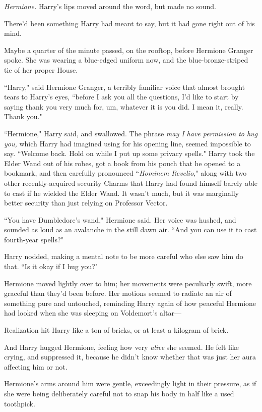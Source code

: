 \emph{Hermione.} Harry's lips moved around the word, but made no sound.

There'd been something Harry had meant to say, but it had gone right out of his mind.

Maybe a quarter of the minute passed, on the rooftop, before Hermione Granger spoke. She was wearing a blue-edged uniform now, and the blue-bronze-striped tie of her proper House.

``Harry," said Hermione Granger, a terribly familiar voice that almost brought tears to Harry's eyes, ``before I ask you all the questions, I'd like to start by saying thank you very much for, um, whatever it is you did. I mean it, really. Thank you."

``Hermione," Harry said, and swallowed. The phrase \emph{may I have permission to hug you,} which Harry had imagined using for his opening line, seemed impossible to say. ``Welcome back. Hold on while I put up some privacy spells." Harry took the Elder Wand out of his robes, got a book from his pouch that he opened to a bookmark, and then carefully pronounced ``\emph{Hominem Revelio,}" along with two other recently-acquired security Charms that Harry had found himself barely able to cast if he wielded the Elder Wand. It wasn't much, but it was marginally better security than just relying on Professor Vector.

``You have Dumbledore's wand," Hermione said. Her voice was hushed, and sounded as loud as an avalanche in the still dawn air. ``And you can use it to cast fourth-year spells?"

Harry nodded, making a mental note to be more careful who else saw him do that. ``Is it okay if I hug you?"

Hermione moved lightly over to him; her movements were peculiarly swift, more graceful than they'd been before. Her motions seemed to radiate an air of something pure and untouched, reminding Harry again of how peaceful Hermione had looked when she was sleeping on Voldemort's altar---

Realization hit Harry like a ton of bricks, or at least a kilogram of brick.

And Harry hugged Hermione, feeling how very \emph{alive} she seemed. He felt like crying, and suppressed it, because he didn't know whether that was just her aura affecting him or not.

Hermione's arms around him were gentle, exceedingly light in their pressure, as if she were being deliberately careful not to snap his body in half like a used toothpick.

